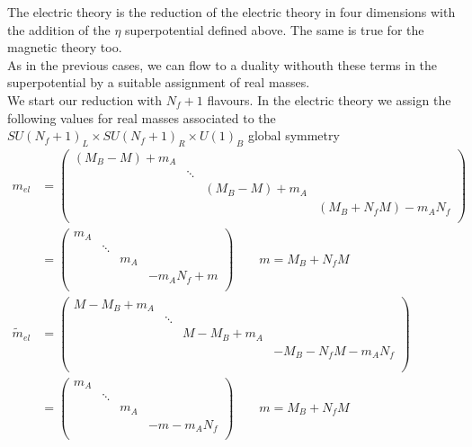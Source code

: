 The electric theory is the reduction of the electric theory in four dimensions with the addition of the $\eta$ superpotential defined above.
The same is true for the magnetic theory too.\\
As in the previous cases, we can flow to a duality withouth these terms in the superpotential by a suitable assignment of real masses.\\ 
We start our reduction with $N_f+1$ flavours.
In the electric theory we assign the following values for real masses associated to the $SU(N_f+1)_L \times SU(N_f+1)_R \times U(1)_B$ global symmetry
\begin{align}
m_{el} &= 
\begin{pmatrix}
   (M_B - M)  + m_A \\ &  \ddots 
   \\ 
   &  & (M_B - M)  + m_A \\
   &  &  & (M_B + N_f M) - m_A N_f  \\
  \end{pmatrix} \\
& = 
\begin{pmatrix}
   m_A \\ &  \ddots 
   \\ 
    & & m_A \\
    & &  & - m_A N_f + m  \\
  \end{pmatrix} \qquad m = M_B + N_f M\\
\tilde{m}_{el} &= 
\begin{pmatrix}
%
M -M_B   + m_A \\ & \ddots \\ & &  M -M_B   + m_A \\
& & &  - M_B -  N_f M - m_A N_f \\
\\
\end{pmatrix}
\\
&= 
 \begin{pmatrix}
  m_A \\ & \ddots \\ & &  m_A \\ & &  &  - m - m_A N_f \\     
 \end{pmatrix}
  \qquad m = M_B + N_f M
 \label{eqn:real_mass_reduction_el}
\end{align}

